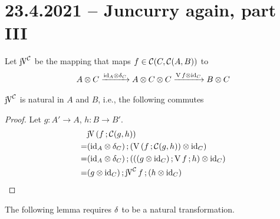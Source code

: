 \documentclass[runningheads,envcountsame]{llncs}
\begin{document}
\section{23.4.2021 -- Juncurry again, part III}

Let $\juncurry[\C]$ be the mapping that maps $f\in \mathcal{C}(C, \mathcal{C}(A, B))$ to 
\begin{gather}
    \tensor{A}{C} \xrightarrow{\tensor{\id_A}{\dup_C}} \tensor{A}{\tensor{C}{C}} \xrightarrow{\tensor{\uncurry\,f}{\id_C}} \tensor{B}{C}
\end{gather}

\begin{lemma}
    $\juncurry[\C]$ is natural in $A$ and $B$, i.e., the following commutes
    \begin{center}
    \end{center}
\end{lemma}
\begin{proof}
    Let $g\colon A' \to A$, $h\colon B \to B'$.
    \begin{align}
        & \juncurry\,(\comp{f}{\homC{g}{h}}) \\
      = & \comp{(\tensor{\id_A}{\dup_C})}{(\tensor{\uncurry\,(\comp{f}{\homC{g}{h})}}{\id_C})} \\
      = & \comp{(\tensor{\id_A}{\dup_C})}{(\tensor{(\comp{(\tensor{g}{\id_C})}{\comp{\uncurry\,f}{h}})}{\id_C})} \\
      = & \comp{(\tensor{g}{\id_C})}{\comp{\juncurry[\C]\,f}{(\tensor{h}{\id_C})}}
    \end{align}
\end{proof}

The following lemma requires $\dup$ to be a natural transformation.
\end{document}
